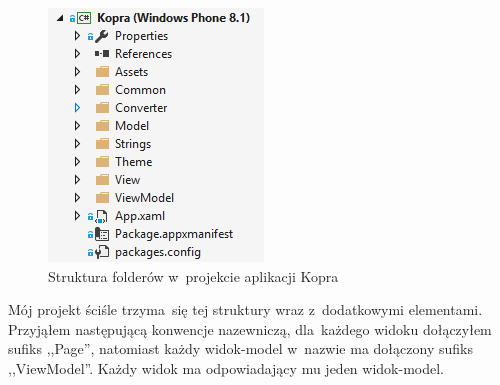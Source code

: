 \documentclass[a4paper,twoside,titlepage,openright]{book}
\begin{document}
\begin{figure}[h]
	\centering
			\includegraphics[resolution=120]{strukturaFolderow.png}
		\caption{Struktura folderów w~projekcie aplikacji Kopra}
\end{figure}

Mój projekt ściśle trzyma~się tej struktury wraz z~dodatkowymi elementami. Przyjąłem następującą konwencje nazewniczą, dla~każdego widoku dołączyłem sufiks ,,Page'', natomiast każdy widok-model w~nazwie ma dołączony sufiks ,,ViewModel''. Każdy widok ma odpowiadający mu jeden widok-model. 
\end{document}
